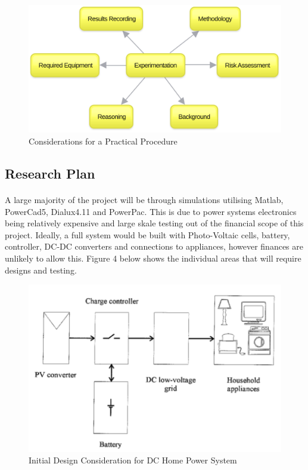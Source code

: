 \begin{figure}[H]
\hfill\includegraphics[width = 160mm]{images/Practical_Planning}\hspace*{\fill}
\caption{Considerations for a Practical Procedure}
\label{fig:EmergingTrends}
\end{figure}     

\subsection{Research Plan}

\paragraph{}
A large majority of the project will be through simulations utilising Matlab, PowerCad5, Dialux4.11 and PowerPac. This is due to power systems electronics being relatively expensive and large skale testing out of the financial scope of this project. Ideally, a full system would be built with Photo-Voltaic cells, battery, controller, DC-DC converters and connections to appliances, however finances are unlikely to allow this. Figure 4 below shows the individual areas that will require designs and testing. 

\begin{figure}[H]
\hfill\includegraphics[width = 160mm]{images/DC_Home}\hspace*{\fill}
\caption{Initial Design Consideration for DC Home Power System \cite{Pellis1997}} 
\label{fig:EmergingTrends}
\end{figure} 

